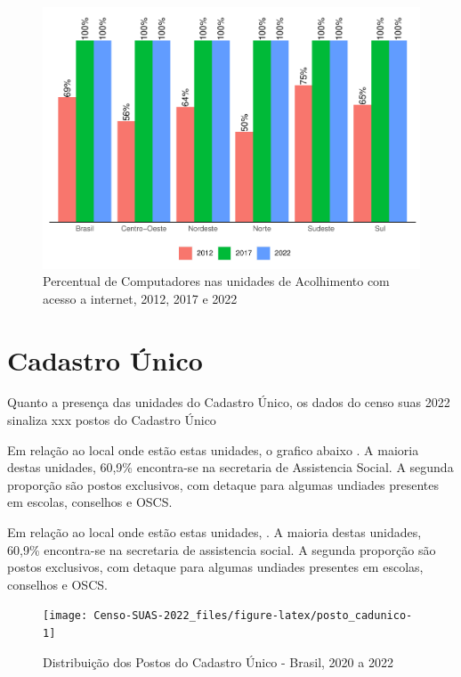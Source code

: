 \documentclass[
  brazilian]{report}
\begin{document}
\begin{figure}
\includegraphics{Censo-SUAS-2022_files/figure-latex/unac-internet-1} \caption[Percentual de Computadores nas unidades de Acolhimento com acesso a internet, 2012, 2017 e 2022]{Percentual de Computadores nas unidades de Acolhimento com acesso a internet, 2012, 2017 e 2022}\label{fig:unac-internet}
\end{figure}

\hypertarget{cadastro-uxfanico}{%
\section{Cadastro Único}\label{cadastro-uxfanico}}

Quanto a presença das unidades do Cadastro Único, os dados do censo suas
2022 sinaliza xxx postos do Cadastro Único

Em relação ao local onde estão estas unidades, o grafico abaixo
. A maioria destas unidades, 60,9\% encontra-se
na secretaria de Assistencia Social. A segunda proporção são postos
exclusivos, com detaque para algumas undiades presentes em escolas,
conselhos e OSCS.

Em relação ao local onde estão estas unidades,
. A maioria destas unidades, 60,9\% encontra-se
na secretaria de assistencia social. A segunda proporção são postos
exclusivos, com detaque para algumas undiades presentes em escolas,
conselhos e OSCS.

\begin{figure}
\texttt{[image: Censo-SUAS-2022\_files/figure-latex/posto\_cadunico-1]} \caption[Distribuição dos Postos do Cadastro Único - Brasil, 2020 a 2022]{Distribuição dos Postos do Cadastro Único - Brasil, 2020 a 2022}\label{fig:posto_cadunico}
\end{figure}
\end{document}
